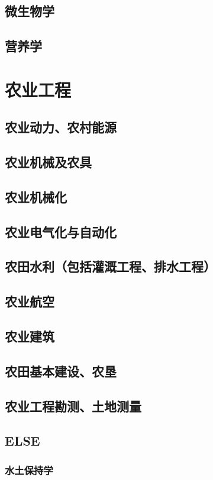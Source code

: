 \documentclass[UTF8]{../ApplicationUniverse}
\begin{document}
\section{微生物学}
\section{营养学}




\chapter{农业工程}
\section{农业动力、农村能源}
\section{农业机械及农具}
\section{农业机械化}
\section{农业电气化与自动化}

\section{农田水利（包括灌溉工程、排水工程）}
\section{农业航空}
\section{农业建筑}
\section{农田基本建设、农垦}
\section{农业工程勘测、土地测量}

\section{ELSE}
\subsection{水土保持学}
\end{document}
